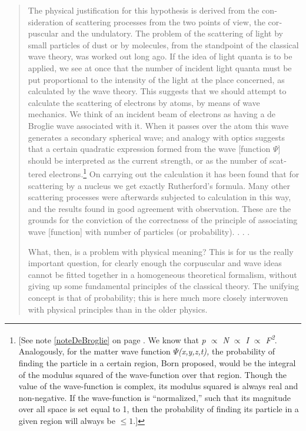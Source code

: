 \begin{quotation}
The physical justification for this hypothesis is derived from the
con­sideration of scattering processes from the two points of view, the
cor­puscular and the undulatory. The problem of the scattering of light
by small particles of dust or by molecules, from the standpoint of the
classical wave theory, was worked out long ago. If the idea of light
quanta is to be applied, we see at once that the number of incident
light quanta must be put proportional to the intensity of the light at
the place concerned, as calculated by the wave theory. This suggests
that we should attempt to calculate the scattering of electrons by
atoms, by means of wave mechanics. We think of an incident beam of
electrons as having a de Broglie wave associated with it. When it passes
over the atom this wave generates a secondary spherical wave; and
analogy with optics sug­gests that a certain quadratic expression formed
from the wave {[}function $\Psi${]} should be interpreted as the
current strength, or as the number of scat­tered electrons.\footnote{{[}See note \ref{noteDeBroglie} on page \pageref{noteDeBroglie}.
  We know that \emph{p $\propto$ N $\propto$ I $\propto$ F\textsuperscript{2}}.
  Analogously, for the matter wave function \emph{$\Psi$(x,y,z,t),} the
  probability of finding the particle in a certain region, Born proposed,
  would be the integral of the modulus squared of
  the wave-function over that region. Though the value of the wave-function
  is complex, its modulus squared is always real and non-negative. If
  the wave-function is ``normalized,'' such that its magnitude over all
  space is set equal to 1, then the probability of finding its particle
  in a given region will always be $\leq 1$.{]}} On carrying out the calculation it
has been found that for scattering by a nucleus we get exactly
Rutherford's formula. Many other scattering processes were afterwards
subjected to calculation in this way, and the results found in good
agreement with observation. These are the grounds for the conviction of
the correctness of the principle of associating wave {[}function{]} with
number of particles (or probability). . . .

What, then, is a problem with physical meaning? This is for us the
really important question, for clearly enough the corpuscular and wave
ideas cannot be fitted together in a homogeneous theoretical formalism,
without giving up some funda­mental principles of the classical theory.
The unifying concept is that of probability; this is here much more
closely interwoven with physical principles than in the older physics.
\end{quotation}

